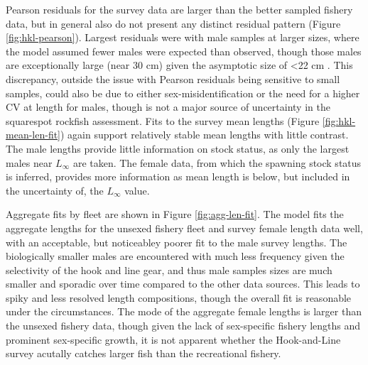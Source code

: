 \documentclass[11pt,
  english,
  a4paper,
]{article}
\begin{document}
Pearson residuals for the survey data are larger than the better sampled fishery data, but in general also do not present any distinct residual pattern (Figure \ref{fig:hkl-pearson}). Largest residuals were with male samples at larger sizes, where the model assumed fewer males were expected than observed, though those males are exceptionally large (near 30 cm) given the asymptotic size of \textless22 cm . This discrepancy, outside the issue with Pearson residuals being sensitive to small samples, could also be due to either sex-misidentification or the need for a higher CV at length for males, though is not a major source of uncertainty in the squarespot rockfish assessment. Fits to the survey mean lengths (Figure \ref{fig:hkl-mean-len-fit}) again support relatively stable mean lengths with little contrast. The male lengths provide little information on stock status, as only the largest males near {\(L_{\infty}\)\leavevmode\tagmcend\tagstructend} are taken. The female data, from which the spawning stock status is inferred, provides more information as mean length is below, but included in the uncertainty of, the {\(L_{\infty}\)\leavevmode\tagmcend\tagstructend} value.

\leavevmode\tagmcend\tagstructend\par


Aggregate fits by fleet are shown in Figure \ref{fig:agg-len-fit}. The model fits the aggregate lengths for the unsexed fishery fleet and survey female length data well, with an acceptable, but noticeabley poorer fit to the male survey lengths. The biologically smaller males are encountered with much less frequency given the selectivity of the hook and line gear, and thus male samples sizes are much smaller and sporadic over time compared to the other data sources. This leads to spiky and less resolved length compositions, though the overall fit is reasonable under the circumstances. The mode of the aggregate female lengths is larger than the unsexed fishery data, though given the lack of sex-specific fishery lengths and prominent sex-specific growth, it is not apparent whether the Hook-and-Line survey acutally catches larger fish than the recreational fishery.

\leavevmode\tagmcend\tagstructend\par

\end{document}
